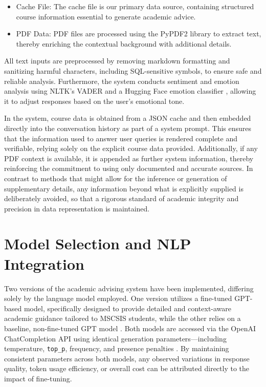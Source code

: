 \documentclass[12pt,oneside,openany]{report}
\begin{document}
\begin{itemize}
 \item Cache File: The cache file is our primary data source, containing structured course information essential to generate academic advice.
 
 \item PDF Data: PDF files are processed using the PyPDF2 \cite{PyPDF2} library to extract text, thereby enriching the contextual background with additional details.
\end{itemize}

All text inputs are preprocessed by removing markdown formatting and sanitizing harmful characters, including SQL-sensitive symbols, to ensure safe and reliable analysis. Furthermore, the system conducts sentiment and emotion analysis using NLTK’s VADER \cite{nltkSentiment} and a Hugging Face emotion classifier \cite{huggingface_models_libraries}, allowing it to adjust responses based on the user’s emotional tone.

In the system, course data is obtained from a JSON cache and then embedded directly into the conversation history as part of a system prompt. This ensures that the information used to answer user queries is rendered complete and verifiable, relying solely on the explicit course data provided. Additionally, if any PDF context is available, it is appended as further system information, thereby reinforcing the commitment to using only documented and accurate sources. In contrast to methods that might allow for the inference or generation of supplementary details, any information beyond what is explicitly supplied is deliberately avoided, so that a rigorous standard of academic integrity and precision in data representation is maintained.

\section{Model Selection and NLP Integration}

Two versions of the academic advising system have been implemented, differing solely by the language model employed. One version utilizes a fine-tuned GPT-based model, specifically designed to provide detailed and context-aware academic guidance tailored to MSCSIS students, while the other relies on a baseline, non-fine-tuned GPT model \cite{openai2024}. Both models are accessed via the OpenAI ChatCompletion API using identical generation parameters—including temperature, \verb|top_p|, frequency, and presence penalties \cite{openaiTextGeneration}. By maintaining consistent parameters across both models, any observed variations in response quality, token usage efficiency, or overall cost can be attributed directly to the impact of fine-tuning.
\end{document}
